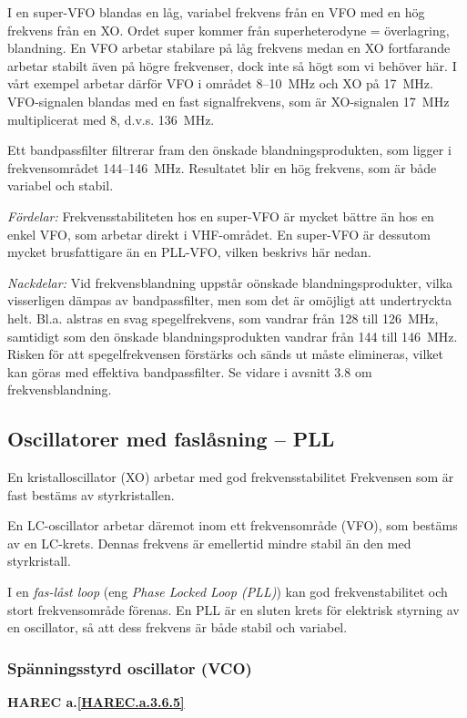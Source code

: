 I en super-VFO blandas en låg, variabel frekvens från en VFO med en
hög frekvens från en XO. Ordet super kommer från superheterodyne =
överlagring, blandning. En VFO arbetar stabilare på låg frekvens
medan en XO fortfarande arbetar stabilt även på högre frekvenser, dock
inte så högt som vi behöver här. I vårt exempel arbetar därför VFO i
området 8--10~MHz och XO på 17~MHz. VFO-signalen blandas med en fast
signalfrekvens, som är XO-signalen 17~MHz multiplicerat med 8,
d.v.s. 136~MHz.

Ett bandpassfilter filtrerar fram den önskade blandningsprodukten, som
ligger i frekvensområdet 144--146~MHz. Resultatet blir en hög frekvens,
som är både variabel och stabil.

\emph{Fördelar:} Frekvensstabiliteten hos en super-VFO är mycket
bättre än hos en enkel VFO, som arbetar direkt i VHF-området. En
super-VFO är dessutom mycket brusfattigare än en PLL-VFO, vilken
beskrivs här nedan.

\emph{Nackdelar:} Vid frekvensblandning uppstår oönskade
blandningsprodukter, vilka visserligen dämpas av bandpassfilter, men
som det är omöjligt att undertryckta helt. Bl.a. alstras en svag
spegelfrekvens, som vandrar från 128 till 126~MHz, samtidigt som den
önskade blandningsprodukten vandrar från 144 till 146~MHz. Risken
för att spegelfrekvensen förstärks och sänds ut måste elimineras,
vilket kan göras med effektiva bandpassfilter. Se vidare i avsnitt 3.8
om frekvensblandning.

\subsection{Oscillatorer med faslåsning -- PLL}

En kristalloscillator (XO) arbetar med god frekvensstabilitet
Frekvensen som är fast bestäms av styrkristallen.

En LC-oscillator arbetar däremot inom ett frekvensområde (VFO), som
bestäms av en LC-krets. Dennas frekvens är emellertid mindre stabil än
den med styrkristall.

I en \emph{fas-låst loop} (eng \emph{Phase Locked Loop (PLL)}) kan god
frekvenstabilitet och stort frekvensområde förenas. En PLL är en sluten krets
för elektrisk styrning av en oscillator, så att dess frekvens är både stabil och
variabel.

\subsubsection{Spänningsstyrd oscillator (VCO)}
\textbf{HAREC a.\ref{HAREC.a.3.6.5}\label{myHAREC.a.3.6.5}}


